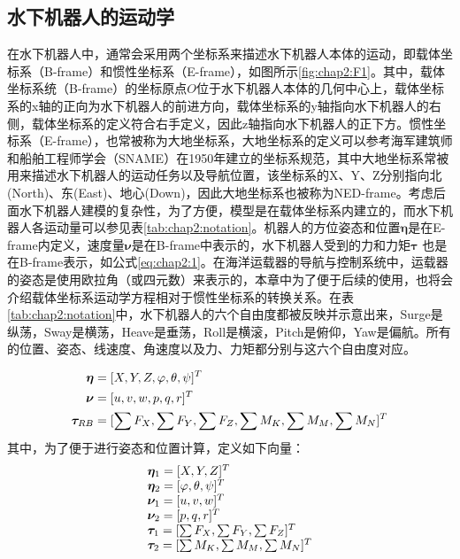 \subsection{水下机器人的运动学 }

在水下机器人中，通常会采用两个坐标系来描述水下机器人本体的运动，即载体坐标系（B-frame）和惯性坐标系（E-frame），如图所示\ref{fig:chap2:F1}。其中，载体坐标系统（B-frame）的坐标原点$O$位于水下机器人本体的几何中心上，载体坐标系的x轴的正向为水下机器人的前进方向，载体坐标系的y轴指向水下机器人的右侧，载体坐标系的定义符合右手定义，因此z轴指向水下机器人的正下方。惯性坐标系（E-frame），也常被称为大地坐标系，大地坐标系的定义可以参考海军建筑师和船舶工程师学会（SNAME）在1950年建立的坐标系规范，其中大地坐标系常被用来描述水下机器人的运动任务以及导航位置，该坐标系的X、Y、Z分别指向北(North)、东(East)、地心(Down)，因此大地坐标系也被称为NED-frame\cite{fossen1994guidance}。考虑后面水下机器人建模的复杂性，为了方便，模型是在载体坐标系内建立的，而水下机器人各运动量可以参见表\ref{tab:chap2:notation}。机器人的方位姿态和位置$\bm \eta$是在E-frame内定义，速度量$\bm \nu$是在B-frame中表示的，水下机器人受到的力和力矩$\bm \tau$ 也是在B-frame表示，如公式\ref{eq:chap2:1}。在海洋运载器的导航与控制系统中，运载器的姿态是使用欧拉角（或四元数）来表示的，本章中为了便于后续的使用，也将会介绍载体坐标系运动学方程相对于惯性坐标系的转换关系。在表\ref{tab:chap2:notation}中，水下机器人的六个自由度都被反映并示意出来，Surge是纵荡，Sway是横荡，Heave是垂荡，Roll是横滚，Pitch是俯仰，Yaw是偏航。所有的位置、姿态、线速度、角速度以及力、力矩都分别与这六个自由度对应。



\begin{equation}
\centering
\label{eq:chap2:1}
\begin{aligned}
 {\bm{\eta}}  &= {[X,Y,Z,\varphi ,\theta ,\psi ]^T} \\
 {\bm{\nu}} &= {[u,v,w,p,q,r]^T} \\
 {\bm{\tau}_{RB}} &= {[ \sum {F_X}, \sum {F_Y}, \sum {F_Z}, \sum {M_K}, \sum {M_M}, \sum {M_N}]^T}\\
 \end{aligned}
 \end{equation}
 其中，为了便于进行姿态和位置计算，定义如下向量：
 \begin{equation*}
 \centering
 \label{eq:chap2:2}
 \begin{array}{l}
 {{\bm{\eta}} _1} = {[X,Y,Z]^T} \\
 {{\bm{\eta}} _2} = {[\varphi ,\theta ,\psi ]^T}\\
 {{\bm{\nu}} _1}= {[u,v,w]^T}\\
 {{\bm{\nu}} _2}= {[p,q,r]^T}\\
 {{\bm{\tau}}_1} = {[ \sum {F_X}, \sum {F_Y}, \sum {F_Z}]^T}\\
 {{\bm{\tau}}_2} = {[ \sum {M_K}, \sum {M_M}, \sum {M_N}]^T}\\
 \end{array}
 \end{equation*}



